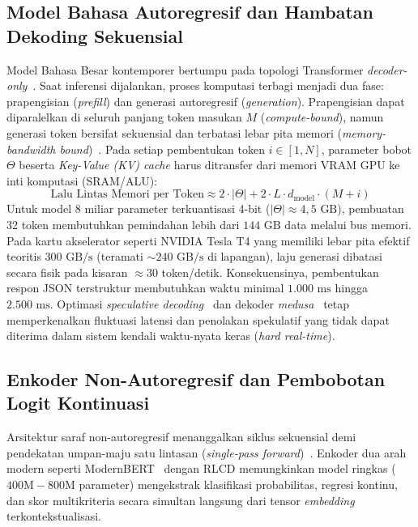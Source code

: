 \documentclass[journal,compsoc]{IEEEtran}
\begin{document}
\subsection{Model Bahasa Autoregresif dan Hambatan Dekoding Sekuensial}
Model Bahasa Besar kontemporer bertumpu pada topologi Transformer \textit{decoder-only}~\cite{vaswani2017attention}. Saat inferensi dijalankan, proses komputasi terbagi menjadi dua fase: prapengisian (\textit{prefill}) dan generasi autoregresif (\textit{generation}). Prapengisian dapat diparalelkan di seluruh panjang token masukan $M$ (\textit{compute-bound}), namun generasi token bersifat sekuensial dan terbatasi lebar pita memori (\textit{memory-bandwidth bound})~\cite{aminabadi2022deepspeed}. Pada setiap pembentukan token $i \in [1, N]$, parameter bobot $\Theta$ beserta \textit{Key-Value (KV) cache} harus ditransfer dari memori VRAM GPU ke inti komputasi (SRAM/ALU):
\begin{equation}
\text{Lalu Lintas Memori per Token} \approx 2 \cdot |\Theta| + 2 \cdot L \cdot d_{\text{model}} \cdot (M + i)
\end{equation}
Untuk model 8 miliar parameter terkuantisasi 4-bit ($|\Theta| \approx 4,5 \text{ GB}$), pembuatan 32 token membutuhkan pemindahan lebih dari $144 \text{ GB}$ data melalui bus memori. Pada kartu akselerator seperti NVIDIA Tesla T4 yang memiliki lebar pita efektif teoritis $300 \text{ GB/s}$ (teramati $\sim 240 \text{ GB/s}$ di lapangan), laju generasi dibatasi secara fisik pada kisaran $\approx 30$ token/detik. Konsekuensinya, pembentukan respon JSON terstruktur membutuhkan waktu minimal $1.000 \text{ ms}$ hingga $2.500 \text{ ms}$. Optimasi \textit{speculative decoding}~\cite{leviathan2023fast} dan dekoder \textit{medusa}~\cite{cai2024medusa} tetap memperkenalkan fluktuasi latensi dan penolakan spekulatif yang tidak dapat diterima dalam sistem kendali waktu-nyata keras (\textit{hard real-time}).

\subsection{Enkoder Non-Autoregresif dan Pembobotan Logit Kontinuasi}
Arsitektur saraf non-autoregresif menanggalkan siklus sekuensial demi pendekatan umpan-maju satu lintasan (\textit{single-pass forward})~\cite{gu2018nonautoregressive}. Enkoder dua arah modern seperti ModernBERT~\cite{warner2024modernbert} dengan RLCD memungkinkan model ringkas ($400\text{M} - 800\text{M}$ parameter) mengekstrak klasifikasi probabilitas, regresi kontinu, dan skor multikriteria secara simultan langsung dari tensor \textit{embedding} terkontekstualisasi.
\end{document}
